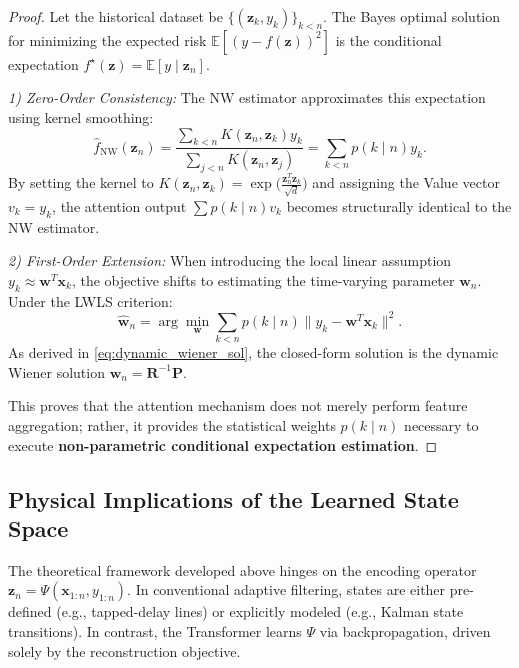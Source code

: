 \documentclass[conference]{IEEEtran}
\begin{document}
\begin{proof}
Let the historical dataset be $\{(\mathbf{z}_k, y_k)\}_{k<n}$. The Bayes optimal solution for minimizing the expected risk $\mathbb{E}[(y - f(\mathbf{z}))^2]$ is the conditional expectation $f^\star(\mathbf{z}) = \mathbb{E}[y \mid \mathbf{z}_n]$.

\textit{1) Zero-Order Consistency:} 
The NW estimator approximates this expectation using kernel smoothing:
\begin{equation}
\hat{f}_{\mathrm{NW}}(\mathbf{z}_n) = \frac{\sum_{k<n} K(\mathbf{z}_n, \mathbf{z}_k) y_k}{\sum_{j<n} K(\mathbf{z}_n, \mathbf{z}_j)} = \sum_{k<n} p(k \mid n) y_k.
\end{equation}
By setting the kernel to $K(\mathbf{z}_n, \mathbf{z}_k) = \exp\big(\frac{\mathbf{z}_n^T \mathbf{z}_k}{\sqrt{d}}\big)$ and assigning the Value vector $v_k = y_k$, the attention output $\sum p(k \mid n) v_k$ becomes structurally identical to the NW estimator.

\textit{2) First-Order Extension:} 
When introducing the local linear assumption $y_k \approx \mathbf{w}^T \mathbf{x}_k$, the objective shifts to estimating the time-varying parameter $\mathbf{w}_n$. Under the LWLS criterion:
\begin{equation}
\hat{\mathbf{w}}_n = \arg\min_{\mathbf{w}} \sum_{k<n} p(k \mid n) \|y_k - \mathbf{w}^T \mathbf{x}_k\|^2.
\end{equation}
As derived in \eqref{eq:dynamic_wiener_sol}, the closed-form solution is the dynamic Wiener solution $\mathbf{w}_n = \mathbf{R}^{-1}\mathbf{P}$. 

This proves that the attention mechanism does not merely perform feature aggregation; rather, it provides the statistical weights $p(k \mid n)$ necessary to execute \textbf{non-parametric conditional expectation estimation}.
\end{proof}

\subsection{Physical Implications of the Learned State Space}
The theoretical framework developed above hinges on the encoding operator $\mathbf{z}_n = \Psi(\mathbf{x}_{1:n}, y_{1:n})$. In conventional adaptive filtering, states are either pre-defined (e.g., tapped-delay lines) or explicitly modeled (e.g., Kalman state transitions). In contrast, the Transformer learns $\Psi$ via backpropagation, driven solely by the reconstruction objective.
\end{document}
